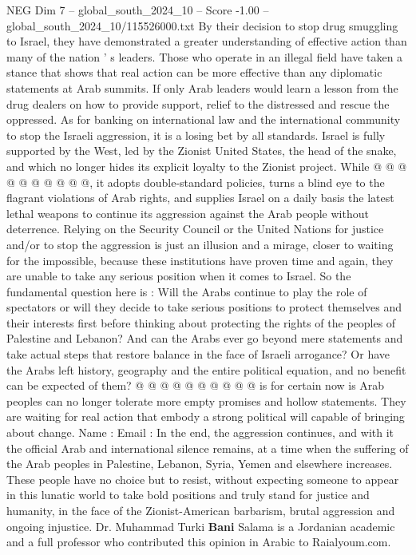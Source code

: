 \begin{textsample}{NEG Dim 7 – global\_south\_2024\_10 – Score -1.00 – global\_south\_2024\_10/115526000.txt}
By their decision to stop drug smuggling to Israel, they have demonstrated a greater understanding of effective action than many of the nation ' s leaders.
Those who operate in an illegal field have taken a stance that shows that real action can be more effective than any diplomatic statements at Arab summits.
If only Arab leaders would learn a lesson from the drug dealers on how to provide support, relief to the distressed and rescue the oppressed.
As for banking on international law and the international community to stop the Israeli aggression, it is a losing bet by all standards.
Israel is fully supported by the West, led by the Zionist United States, the head of the snake, and which no longer hides its explicit loyalty to the Zionist project.
While @ @ @ @ @ @ @ @ @ @, it adopts double-standard policies, turns a blind eye to the flagrant violations of Arab rights, and supplies Israel on a daily basis the latest lethal weapons to continue its aggression against the Arab people without deterrence.
Relying on the Security Council or the United Nations for justice and/or to stop the aggression is just an illusion and a mirage, closer to waiting for the impossible, because these institutions have proven time and again, they are unable to take any serious position when it comes to Israel.
So the fundamental question here is : Will the Arabs continue to play the role of spectators or will they decide to take serious positions to protect themselves and their interests first before thinking about protecting the rights of the peoples of Palestine and Lebanon?
And can the Arabs ever go beyond mere statements and take actual steps that restore balance in the face of Israeli arrogance?
Or have the Arabs left history, geography and the entire political equation, and no benefit can be expected of them? @ @ @ @ @ @ @ @ @ @ is for certain now is Arab peoples can no longer tolerate more empty promises and hollow statements.
They are waiting for real action that embody a strong political will capable of bringing about change.
Name : Email : In the end, the aggression continues, and with it the official Arab and international silence remains, at a time when the suffering of the Arab peoples in Palestine, Lebanon, Syria, Yemen and elsewhere increases.
These people have no choice but to resist, without expecting someone to appear in this lunatic world to take bold positions and truly stand for justice and humanity, in the face of the Zionist-American barbarism, brutal aggression and ongoing injustice.
Dr.
Muhammad Turki \textbf{Bani} Salama is a Jordanian academic and a full professor who contributed this opinion in Arabic to Raialyoum.com.

\end{textsample}

